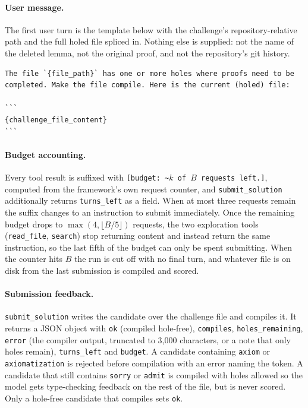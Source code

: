 \documentclass{article}
\begin{document}
\paragraph{User message.} The first user turn is the template below with the challenge's
repository-relative path and the full holed file spliced in. Nothing else is supplied: not the
name of the deleted lemma, not the original proof, and not the repository's git history.
\begin{lstlisting}
The file `{file_path}` has one or more holes where proofs need to be completed. Make the file compile. Here is the current (holed) file:

```
{challenge_file_content}
```
\end{lstlisting}

\paragraph{Budget accounting.} Every tool result is suffixed with
\texttt{[budget: \textasciitilde{}$k$ of $B$ requests left.]}, computed from the framework's own
request counter, and \texttt{submit\_solution} additionally returns \texttt{turns\_left} as a
field. When at most three requests remain the suffix changes to an instruction to submit
immediately. Once the remaining budget drops to $\max(4, \lfloor B/5 \rfloor)$ requests, the two
exploration tools (\texttt{read\_file}, \texttt{search}) stop returning content and instead
return the same instruction, so the last fifth of the budget can only be spent submitting.
When the counter hits $B$ the run is cut off with no final turn, and whatever file is on disk
from the last submission is compiled and scored.

\paragraph{Submission feedback.} \texttt{submit\_solution} writes the candidate over the
challenge file and compiles it. It returns a JSON object with \texttt{ok} (compiled hole-free),
\texttt{compiles}, \texttt{holes\_remaining}, \texttt{error} (the compiler output, truncated to
3{,}000 characters, or a note that only holes remain), \texttt{turns\_left} and \texttt{budget}.
A candidate containing \texttt{axiom} or \texttt{axiomatization} is rejected before compilation
with an error naming the token. A candidate that still contains \texttt{sorry} or \texttt{admit}
is compiled with holes allowed so the model gets type-checking feedback on the rest of the file,
but is never scored. Only a hole-free candidate that compiles sets \texttt{ok}.
\end{document}
